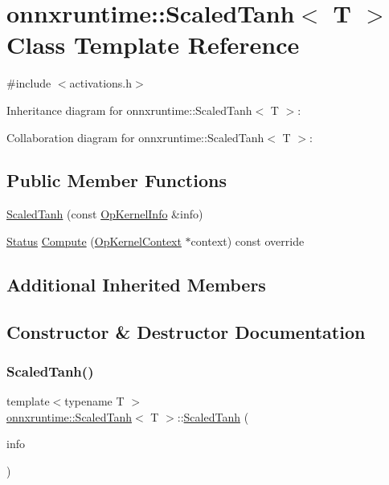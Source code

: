 \hypertarget{classonnxruntime_1_1ScaledTanh}{}\section{onnxruntime\+:\+:Scaled\+Tanh$<$ T $>$ Class Template Reference}
\label{classonnxruntime_1_1ScaledTanh}


{\ttfamily \#include $<$activations.\+h$>$}



Inheritance diagram for onnxruntime\+:\+:Scaled\+Tanh$<$ T $>$\+:


Collaboration diagram for onnxruntime\+:\+:Scaled\+Tanh$<$ T $>$\+:
\subsection*{Public Member Functions}
\begin{DoxyCompactItemize}
\item 
\mbox{\hyperlink{classonnxruntime_1_1ScaledTanh_aca9b8f41f8778653166291fbe9fa4e0e}{Scaled\+Tanh}} (const \mbox{\hyperlink{classonnxruntime_1_1OpKernelInfo}{Op\+Kernel\+Info}} \&info)
\item 
\mbox{\hyperlink{classonnxruntime_1_1common_1_1Status}{Status}} \mbox{\hyperlink{classonnxruntime_1_1ScaledTanh_a55a336b0faa64cc9a1a228df25086373}{Compute}} (\mbox{\hyperlink{classonnxruntime_1_1OpKernelContext}{Op\+Kernel\+Context}} $\ast$context) const override
\end{DoxyCompactItemize}
\subsection*{Additional Inherited Members}


\subsection{Constructor \& Destructor Documentation}
\mbox{\label{classonnxruntime_1_1ScaledTanh_aca9b8f41f8778653166291fbe9fa4e0e}} 
\subsubsection{\texorpdfstring{Scaled\+Tanh()}{ScaledTanh()}}
{\footnotesize\ttfamily template$<$typename T $>$ \\
\mbox{\hyperlink{classonnxruntime_1_1ScaledTanh}{onnxruntime\+::\+Scaled\+Tanh}}$<$ T $>$\+::\mbox{\hyperlink{classonnxruntime_1_1ScaledTanh}{Scaled\+Tanh}} (\begin{DoxyParamCaption}\item[{const \mbox{\hyperlink{classonnxruntime_1_1OpKernelInfo}{Op\+Kernel\+Info}} \&}]{info }\end{DoxyParamCaption})\hspace{0.3cm}{\ttfamily [inline]}}



